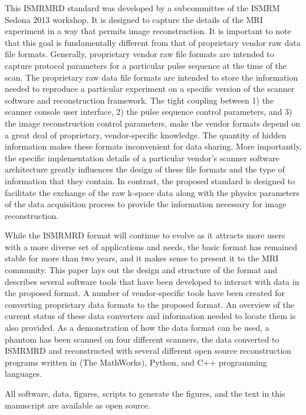 \documentclass[12pt, draft]{article}
\newcommand{\mreplaced}[2][None]{\replaced[remark=#1]{#2}}
\begin{document}
This ISMRMRD standard was developed by a subcommittee of the ISMRM Sedona 2013 workshop.  It is designed to capture the details of the MRI experiment in a way that permits image reconstruction.  It is important to note that this goal is fundamentally different from that of proprietary vendor raw data file formats.  Generally, proprietary vendor raw file formats are intended to capture protocol parameters for a particular pulse sequence at the time of the scan.  The proprietary raw data file formats are intended to store the information needed to reproduce a particular experiment on a specific version of the scanner software and reconstruction framework.  The tight coupling between 1) the scanner console user interface, 2) the pulse sequence control parameters, and 3) the image reconstruction control parameters, make the vendor formats depend on a great deal of proprietary, vendor-specific knowledge. The quantity of hidden information makes these formats inconvenient for data sharing.  More importantly, the specific implementation details of a particular vendor's scanner software architecture greatly influences the design of these file formats and the type of information that they contain.  In contrast, the proposed standard is designed to facilitate the exchange of the raw k-space data along with the physics parameters of the data acquisition process to provide the information necessary for image reconstruction.

While the ISMRMRD format will continue to evolve as it attracts more users with a more diverse set of applications and needs, the basic format has remained stable for more than two years, and it makes sense to present it to the MRI community. This paper lays out the design and structure of the format and describes several software tools that have been developed to interact with data in the proposed format. A number of vendor-specific tools have been created for converting proprietary data formats to the proposed format. An overview of the current status of these data converters and information needed to locate them is also provided. As a demonstration of how the data format can be used, a phantom has been scanned on four different scanners, the data converted to ISMRMRD and reconstructed with several different open source reconstruction programs written in  \mreplaced[R2.14]{MATLAB}{Matlab} (The MathWorks), Python, and C++ programming languages. 

All software, data, figures, scripts to generate the figures, and the text in this manuscript are available as open source. 
\end{document}
